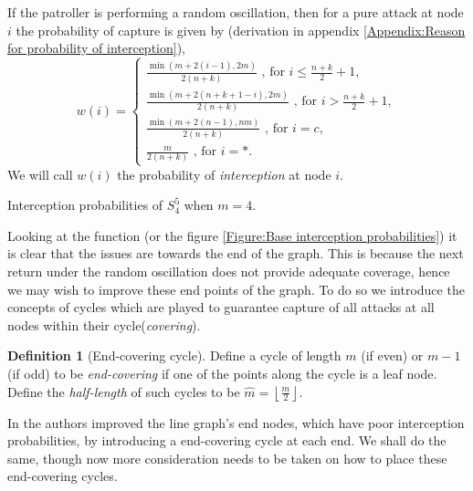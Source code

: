 \documentclass[a4paper,10pt]{article}
\newcommand{\floor}[1]{\left \lfloor #1 \right \rfloor}
\theoremstyle{definition}
\newtheorem{definition}[theorem]{Definition}
\theoremstyle{definition}
\theoremstyle{remark}
\theoremstyle{definition}
\begin{document}
If the patroller is performing a random oscillation, then for a pure attack at node $i$ the probability of capture is given by (derivation in appendix \ref{Appendix:Reason for probability of interception}),
\begin{equation}
\label{eq:Prob of Interception}
w(i)= \left\{\begin{array}{l}
 \frac{\min(m+2(i-1),2m)}{2(n+k)} \text{  , for } i \leq \frac{n+k}{2} +1, \\
 \frac{\min(m+2(n+k+1-i),2m)}{2(n+k)} \text{  , for } i > \frac{n+k}{2} +1, \\
 \frac{\min(m+2(n-1),nm)}{2(n+k)} \text{  , for } i=c, \\
 \frac{m}{2(n+k)} \text{  , for } i=*. 
\end{array} \right.
\end{equation}
We will call $w(i)$ the probability of \textit{interception} at node $i$.

\begin{myfigure}
\begin{center}

\end{center}
\caption{Interception probabilities of $S^5_{4}$ when $m=4$.}
\label{Figure:Base interception probabilities}
\end{myfigure}

Looking at the function (or the figure \ref{Figure:Base interception probabilities}) it is clear that the issues are towards the end of the graph. This is because the next return under the random oscillation does not provide adequate coverage, hence we may wish to improve these end points of the graph. To do so we introduce the concepts of cycles which are played to guarantee capture of all attacks at all nodes within their cycle(\textit{covering}).

\begin{definition}[End-covering cycle]
Define a cycle of length $m$ (if even) or $m-1$ (if odd) to be \textit{end-covering} if one of the points along the cycle is a leaf node. Define the \textit{half-length} of such cycles to be $\hat{m}=\floor{\frac{m}{2}}$.
\end{definition}

In \cite{Papadaki2016} the authors improved the line graph's end nodes, which have poor interception probabilities, by introducing a end-covering cycle at each end. We shall do the same, though now more consideration needs to be taken on how to place these end-covering cycles. 
\end{document}
